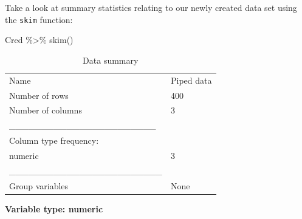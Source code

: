 \documentclass[
  letterpaper,
  DIV=11,
  numbers=noendperiod]{scrartcl}
\newenvironment{Shaded}{\begin{snugshade}}{\end{snugshade}}
\newcommand{\FunctionTok}[1]{\textcolor[rgb]{0.28,0.35,0.67}{#1}}
\newcommand{\NormalTok}[1]{\textcolor[rgb]{0.00,0.23,0.31}{#1}}
\newcommand{\SpecialCharTok}[1]{\textcolor[rgb]{0.37,0.37,0.37}{#1}}
\begin{document}
Take a look at summary statistics relating to our newly created data set
using the \texttt{skim} function:

\begin{Shaded}
\begin{Highlighting}[]
\NormalTok{Cred }\SpecialCharTok{\%\textgreater{}\%}
  \FunctionTok{skim}\NormalTok{()}
\end{Highlighting}
\end{Shaded}

\begin{longtable}[]{@{}ll@{}}
\caption{Data summary}\tabularnewline
\toprule\noalign{}
\endfirsthead
\endhead
\bottomrule\noalign{}
\endlastfoot
Name & Piped data \\
Number of rows & 400 \\
Number of columns & 3 \\
\_\_\_\_\_\_\_\_\_\_\_\_\_\_\_\_\_\_\_\_\_\_\_ & \\
Column type frequency: & \\
numeric & 3 \\
\_\_\_\_\_\_\_\_\_\_\_\_\_\_\_\_\_\_\_\_\_\_\_\_ & \\
Group variables & None \\
\end{longtable}

\textbf{Variable type: numeric}
\end{document}
